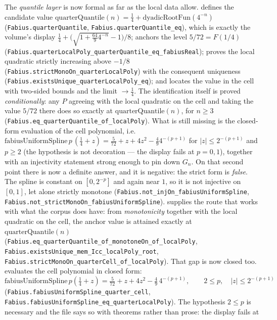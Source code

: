 \documentclass[11pt,oneside]{article}
\numberwithin{equation}{section}
\theoremstyle{definition}
\theoremstyle{remark}
\begin{document}
\begin{obligation}
The \emph{quantile layer} is now formal as far as the local data allow.
 defines the candidate value
\(\mathrm{quarterQuantile}(n)=\tfrac14+\mathrm{dyadicRootFun}(4^{-n})\)
(\nolinkurl{Fabius.quarterQuantile}, \nolinkurl{Fabius.quarterQuantile\_eq}), which is exactly the
volume's display \(\tfrac14+\bigl(\sqrt{1+\tfrac{64}{9}4^{-n}}-1\bigr)/8\); anchors the level
\(5/72=F(1/4)\)
(\nolinkurl{Fabius.quarterLocalPoly\_quarterQuantile\_eq\_fabiusReal}); proves the local
quadratic strictly increasing above \(-1/8\)
(\nolinkurl{Fabius.strictMonoOn\_quarterLocalPoly}) with the consequent uniqueness
(\nolinkurl{Fabius.existsUnique\_quarterLocalPoly\_eq}); and locates the value in the cell
with two-sided bounds and the limit \(\to\tfrac14\).  The identification itself is proved
\emph{conditionally}: any \(P\) agreeing with the local quadratic on the cell and taking
the value \(5/72\) there does so exactly at \(\mathrm{quarterQuantile}(n)\), for \(n\ge3\)
(\nolinkurl{Fabius.eq\_quarterQuantile\_of\_localPoly}).  What is still missing is the
closed-form evaluation of the cell polynomial, i.e.
\(\mathrm{fabiusUniformSpline}\,p\,(\tfrac14+z)=\tfrac{5}{72}+z+4z^{2}-\tfrac49 4^{-(p+1)}\)
for \(\lvert z\rvert\le2^{-(p+1)}\) and \(p\ge2\) (the hypothesis is not decoration --- the
display fails at $p=0,1$), together with an injectivity statement strong enough to pin
down \(G_n\).  On that second point there is now a definite answer, and it is negative:
the strict form is \emph{false}.  The spline is constant on $[0,2^{-p}]$ and again
near $1$, so it is not injective on $[0,1]$, let alone strictly monotone
(\nolinkurl{Fabius.not_injOn_fabiusUniformSpline},
\nolinkurl{Fabius.not_strictMonoOn_fabiusUniformSpline}).  
supplies the route that works with what the corpus does have: from \emph{monotonicity}
together with the local quadratic on the cell, the anchor value is attained exactly at
\(\mathrm{quarterQuantile}(n)\)
(\nolinkurl{Fabius.eq_quarterQuantile_of_monotoneOn_of_localPoly},
\nolinkurl{Fabius.existsUnique_mem_Icc_localPoly_root}, \nolinkurl{Fabius.strictMonoOn_quarterCell_of_localPoly}).  That gap is now closed too.
 evaluates the cell polynomial in closed form:
\[
  \mathrm{fabiusUniformSpline}\,p\left(\tfrac14+z\right)
  =\tfrac{5}{72}+z+4z^{2}-\tfrac49\,4^{-(p+1)},
  \qquad 2\le p,\quad \lvert z\rvert\le 2^{-(p+1)}
\]
(\nolinkurl{Fabius.fabiusUniformSpline_quarter_cell},
\nolinkurl{Fabius.fabiusUniformSpline_eq_quarterLocalPoly}).  The hypothesis \(2\le p\) is
necessary and the file says so with theorems rather than prose: the display fails at

\end{obligation}
\end{document}
